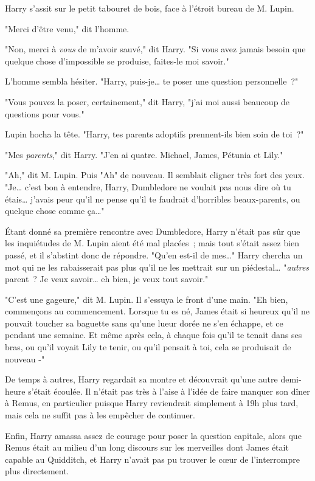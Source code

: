 Harry s'assit sur le petit tabouret de bois, face à l'étroit bureau de M. Lupin.

"Merci d'être venu," dit l'homme.

"Non, merci à \emph{vous} de m'avoir sauvé," dit Harry. "Si vous avez jamais besoin que quelque chose d'impossible se produise, faites-le moi savoir."

L'homme sembla hésiter. "Harry, puis-je… te poser une question personnelle~?"

"Vous pouvez la poser, certainement," dit Harry, "j'ai moi aussi beaucoup de questions pour vous."

Lupin hocha la tête. "Harry, tes parents adoptifs prennent-ils bien soin de toi~?"

"Mes \emph{parents}," dit Harry. "J'en ai quatre. Michael, James, Pétunia et Lily."

"Ah," dit M. Lupin. Puis "Ah" de nouveau. Il semblait cligner très fort des yeux. "Je… c'est bon à entendre, Harry, Dumbledore ne voulait pas nous dire où tu étais… j'avais peur qu'il ne pense qu'il te faudrait d'horribles beaux-parents, ou quelque chose comme ça…"

Étant donné sa première rencontre avec Dumbledore, Harry n'était pas sûr que les inquiétudes de M. Lupin aient été mal placées~; mais tout s'était assez bien passé, et il s'abstint donc de répondre. "Qu'en est-il de mes…" Harry chercha un mot qui ne les rabaisserait pas plus qu'il ne les mettrait sur un piédestal… "\emph{autres} parent~? Je veux savoir… eh bien, je veux tout savoir."

"C'est une gageure," dit M. Lupin. Il s'essuya le front d'une main. "Eh bien, commençons au commencement. Lorsque tu es né, James était si heureux qu'il ne pouvait toucher sa baguette sans qu'une lueur dorée ne s'en échappe, et ce pendant une semaine. Et même après cela, à chaque fois qu'il te tenait dans ses bras, ou qu'il voyait Lily te tenir, ou qu'il pensait à toi, cela se produisait de nouveau -"

\later

De temps à autres, Harry regardait sa montre et découvrait qu'une autre demi-heure s'était écoulée. Il n'était pas très à l'aise à l'idée de faire manquer son dîner à Remus, en particulier puisque Harry reviendrait simplement à 19h plus tard, mais cela ne suffit pas à les empêcher de continuer.

Enfin, Harry amassa assez de courage pour poser la question capitale, alors que Remus était au milieu d'un long discours sur les merveilles dont James était capable au Quidditch, et Harry n'avait pas pu trouver le cœur de l'interrompre plus directement.


